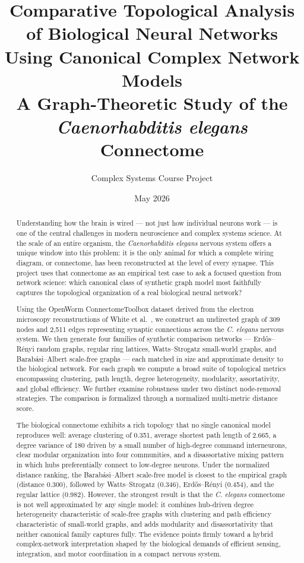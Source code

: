 \documentclass[12pt,a4paper]{report}
\title{\textbf{Comparative Topological Analysis of Biological Neural Networks Using Canonical Complex Network Models}\\[1em]
\large A Graph-Theoretic Study of the \textit{Caenorhabditis elegans} Connectome}
\author{Complex Systems Course Project}
\date{May 2026}
\begin{document}
\hypersetup{pageanchor=false}
\maketitle

\begin{abstract}
Understanding how the brain is wired — not just how individual neurons work — is one of the central challenges in modern neuroscience and complex systems science. At the scale of an entire organism, the \textit{Caenorhabditis elegans} nervous system offers a unique window into this problem: it is the only animal for which a complete wiring diagram, or connectome, has been reconstructed at the level of every synapse. This project uses that connectome as an empirical test case to ask a focused question from network science: which canonical class of synthetic graph model most faithfully captures the topological organization of a real biological neural network?

Using the OpenWorm ConnectomeToolbox dataset derived from the electron microscopy reconstructions of White et al.~\cite{white1986structure}, we construct an undirected graph of 309 nodes and 2{,}511 edges representing synaptic connections across the \textit{C. elegans} nervous system. We then generate four families of synthetic comparison networks — Erd\H{o}s--R\'{e}nyi random graphs, regular ring lattices, Watts--Strogatz small-world graphs, and Barab\'{a}si--Albert scale-free graphs — each matched in size and approximate density to the biological network. For each graph we compute a broad suite of topological metrics encompassing clustering, path length, degree heterogeneity, modularity, assortativity, and global efficiency. We further examine robustness under two distinct node-removal strategies. The comparison is formalized through a normalized multi-metric distance score.

The biological connectome exhibits a rich topology that no single canonical model reproduces well: average clustering of 0.351, average shortest path length of 2.665, a degree variance of 180 driven by a small number of high-degree command interneurons, clear modular organization into four communities, and a disassortative mixing pattern in which hubs preferentially connect to low-degree neurons. Under the normalized distance ranking, the Barab\'{a}si--Albert scale-free model is closest to the empirical graph (distance 0.300), followed by Watts--Strogatz (0.346), Erd\H{o}s--R\'{e}nyi (0.454), and the regular lattice (0.982). However, the strongest result is that the \textit{C. elegans} connectome is not well approximated by any single model: it combines hub-driven degree heterogeneity characteristic of scale-free graphs with clustering and path efficiency characteristic of small-world graphs, and adds modularity and disassortativity that neither canonical family captures fully. The evidence points firmly toward a hybrid complex-network interpretation shaped by the biological demands of efficient sensing, integration, and motor coordination in a compact nervous system.
\end{abstract}
\end{document}
